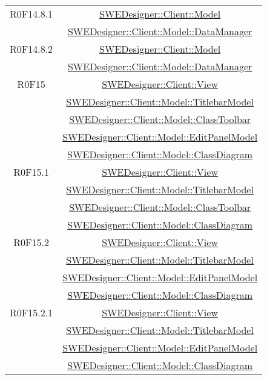 \documentclass[../SpecificaTecnica.tex]{subfiles}
\begin{document}
\begin{longtable}{|c|c|}
		R0F14.8.1 & \hyperlink{SWEDesigner::Client::Model}{SWEDesigner::Client::Model}\\& \hyperlink{SWEDesigner::Client::Model::DataManager}{SWEDesigner::Client::Model::DataManager}\\\hline
		R0F14.8.2 & \hyperlink{SWEDesigner::Client::Model}{SWEDesigner::Client::Model}\\& \hyperlink{SWEDesigner::Client::Model::DataManager}{SWEDesigner::Client::Model::DataManager}\\\hline
		R0F15 & \hyperlink{SWEDesigner::Client::View}{SWEDesigner::Client::View}\\& \hyperlink{SWEDesigner::Client::Model::TitlebarModel}{SWEDesigner::Client::Model::TitlebarModel}\\& \hyperlink{SWEDesigner::Client::Model::ClassToolbar}{SWEDesigner::Client::Model::ClassToolbar}\\& \hyperlink{SWEDesigner::Client::Model::EditPanelModel}{SWEDesigner::Client::Model::EditPanelModel}\\& \hyperlink{SWEDesigner::Client::Model::ClassDiagram}{SWEDesigner::Client::Model::ClassDiagram}\\\hline
		R0F15.1 & \hyperlink{SWEDesigner::Client::View}{SWEDesigner::Client::View}\\& \hyperlink{SWEDesigner::Client::Model::TitlebarModel}{SWEDesigner::Client::Model::TitlebarModel}\\& \hyperlink{SWEDesigner::Client::Model::ClassToolbar}{SWEDesigner::Client::Model::ClassToolbar}\\& \hyperlink{SWEDesigner::Client::Model::ClassDiagram}{SWEDesigner::Client::Model::ClassDiagram}\\\hline
		R0F15.2 & \hyperlink{SWEDesigner::Client::View}{SWEDesigner::Client::View}\\& \hyperlink{SWEDesigner::Client::Model::TitlebarModel}{SWEDesigner::Client::Model::TitlebarModel}\\& \hyperlink{SWEDesigner::Client::Model::EditPanelModel}{SWEDesigner::Client::Model::EditPanelModel}\\& \hyperlink{SWEDesigner::Client::Model::ClassDiagram}{SWEDesigner::Client::Model::ClassDiagram}\\\hline
		R0F15.2.1 & \hyperlink{SWEDesigner::Client::View}{SWEDesigner::Client::View}\\& \hyperlink{SWEDesigner::Client::Model::TitlebarModel}{SWEDesigner::Client::Model::TitlebarModel}\\& \hyperlink{SWEDesigner::Client::Model::EditPanelModel}{SWEDesigner::Client::Model::EditPanelModel}\\& \hyperlink{SWEDesigner::Client::Model::ClassDiagram}{SWEDesigner::Client::Model::ClassDiagram}\\\hline

\end{longtable}
\end{document}
